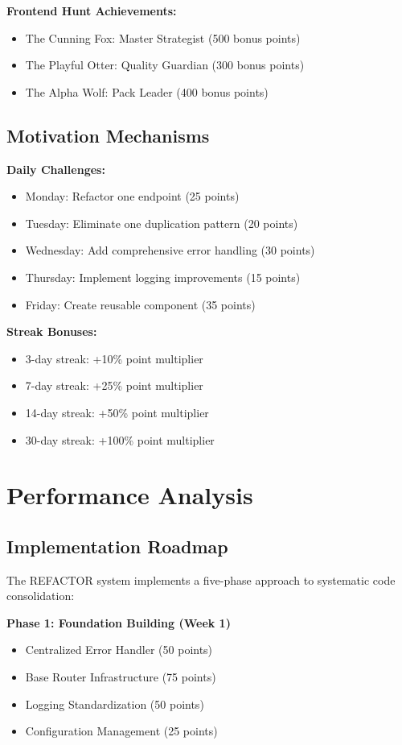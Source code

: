 \documentclass[10pt]{article}
\begin{document}
\textbf{Frontend Hunt Achievements:}
\begin{itemize}
    \item The Cunning Fox: Master Strategist (500 bonus points)
    \item The Playful Otter: Quality Guardian (300 bonus points)
    \item The Alpha Wolf: Pack Leader (400 bonus points)
\end{itemize}

\subsection{Motivation Mechanisms}

\textbf{Daily Challenges:}
\begin{itemize}
    \item Monday: Refactor one endpoint (25 points)
    \item Tuesday: Eliminate one duplication pattern (20 points)
    \item Wednesday: Add comprehensive error handling (30 points)
    \item Thursday: Implement logging improvements (15 points)
    \item Friday: Create reusable component (35 points)
\end{itemize}

\textbf{Streak Bonuses:}
\begin{itemize}
    \item 3-day streak: +10\% point multiplier
    \item 7-day streak: +25\% point multiplier
    \item 14-day streak: +50\% point multiplier
    \item 30-day streak: +100\% point multiplier
\end{itemize}

\section{Performance Analysis}

\subsection{Implementation Roadmap}

The REFACTOR system implements a five-phase approach to systematic code consolidation:

\textbf{Phase 1: Foundation Building (Week 1)}
\begin{itemize}
    \item Centralized Error Handler (50 points)
    \item Base Router Infrastructure (75 points)
    \item Logging Standardization (50 points)
    \item Configuration Management (25 points)
\end{itemize}
\end{document}

